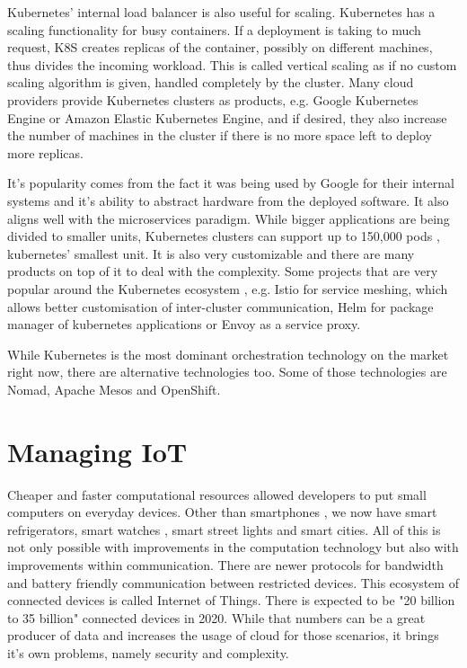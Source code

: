 Kubernetes' internal load balancer is also useful for scaling. Kubernetes has a scaling functionality for busy containers. If a deployment is taking to much request, K8S creates replicas of the container, possibly on different machines, thus divides the incoming workload. This is called vertical scaling as if no custom scaling algorithm is given, handled completely by the cluster. Many cloud providers provide Kubernetes clusters as products, e.g. Google Kubernetes Engine or Amazon Elastic Kubernetes Engine, and if desired, they also increase the number of machines in the cluster if there is no more space left to deploy more replicas.

It's popularity comes from the fact it was being used by Google for their internal systems and it's ability to abstract hardware from the deployed software. It also aligns well with the microservices paradigm. While bigger applications are being divided to smaller units, Kubernetes clusters can support up to 150,000 pods \cite{kubernetes-load}, kubernetes' smallest unit. It is also very customizable and there are many products on top of it to deal with the complexity. Some projects that are very popular around the Kubernetes ecosystem , e.g. Istio for service meshing, which allows better customisation of inter-cluster communication, Helm for package manager of kubernetes applications or Envoy as a service proxy.

While Kubernetes is the most dominant orchestration technology on the market right now, there are alternative technologies too. Some of those technologies are Nomad, Apache Mesos and OpenShift.

\newpage
\section{Managing IoT}
Cheaper and faster computational resources allowed developers to put small computers on everyday devices. Other than smartphones , we now have smart refrigerators, smart watches , smart street lights and smart cities. All of this is not only possible with improvements in the computation technology but also with improvements within communication. There are newer protocols for bandwidth and battery friendly communication between restricted devices. This ecosystem of connected devices is called Internet of Things. There is expected to be "20 billion to 35 billion"\cite{unikernels-improve} connected devices in 2020. While that numbers can be a great producer of data and increases the usage of cloud for those scenarios, it brings it's own problems, namely security and complexity.

